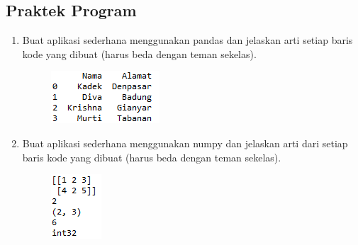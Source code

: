 \subsection{Praktek Program}
\begin{enumerate}
	\item Buat aplikasi sederhana menggunakan pandas dan jelaskan arti setiap baris kode yang dibuat (harus beda dengan teman sekelas).
	\hfill\break
	
	\begin{figure}[H]
	\centering
		\includegraphics[width=8 cm]{figures/1174006/chapter3/soalpraktek/1.PNG}
	\end{figure}

	\item Buat aplikasi sederhana menggunakan numpy dan jelaskan arti dari setiap baris kode yang dibuat (harus beda dengan teman sekelas).
	\hfill\break
	
	\begin{figure}[H]
	\centering
		\includegraphics[width=8 cm]{figures/1174006/chapter3/soalpraktek/2.PNG}
	\end{figure}


\end{enumerate}
